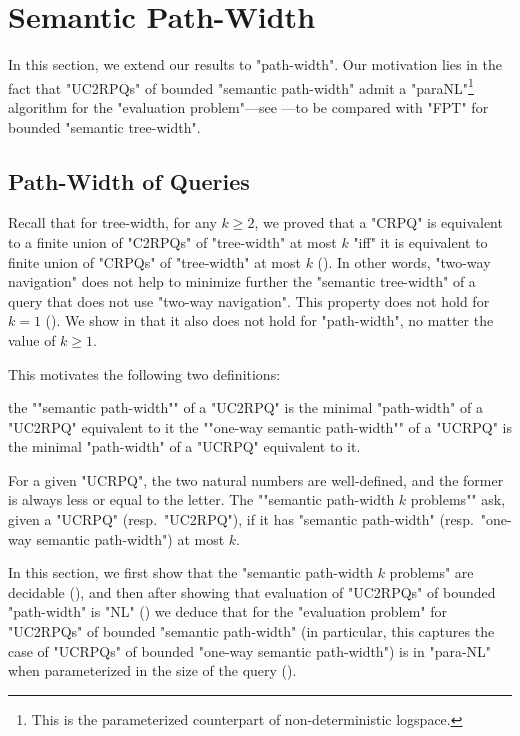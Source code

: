 \section{Semantic Path-Width}
\label{sec:semantic-path-width}

In this section, we extend our results to "path-width". Our motivation lies in the fact that "UC2RPQs" of bounded "semantic path-width" admit a "paraNL"\footnote{This is the parameterized counterpart of non-deterministic logspace.} algorithm for the 
"evaluation problem"---see ---to be compared with "FPT" for bounded "semantic tree-width".

\subsection{Path-Width of Queries}

Recall that for tree-width, for any $k \geq 2$, we proved that a "CRPQ" is equivalent to a
finite union of "C2RPQs" of "tree-width" at most $k$ "iff" it is equivalent to finite union of
"CRPQs" of "tree-width" at most $k$ (). In other words, "two-way navigation" does not help to minimize further the "semantic tree-width" of a query that does not use "two-way navigation". This property does not hold for $k=1$
(). We show in  that it also does not hold for
"path-width", no matter the value of $k \geq 1$.

This motivates the following two definitions:
\begin{itemize}
	\itemAP the ""semantic path-width"" of a "UC2RPQ" is the minimal "path-width"
	of a "UC2RPQ" equivalent to it
	\itemAP the ""one-way semantic path-width"" of a "UCRPQ" is the minimal "path-width"
		of a "UCRPQ" equivalent to it.
\end{itemize}
For a given "UCRPQ", the two natural numbers are well-defined, and the former is always less or equal to
the letter.
The \AP ""semantic path-width $k$ problems"" ask, given a "UCRPQ" (resp.\ "UC2RPQ"), if it has
"semantic path-width" (resp.\ "one-way semantic path-width") at most $k$.

In this section, we first show that the "semantic path-width $k$ problems"
are decidable (), and then 
after showing that evaluation of "UC2RPQs" of bounded "path-width" is "NL" () we deduce that for the "evaluation problem" for
"UC2RPQs" of bounded "semantic path-width" (in particular, this captures the
case of "UCRPQs" of bounded "one-way semantic path-width") is in
"para-NL" when parameterized in the size of the query ().

